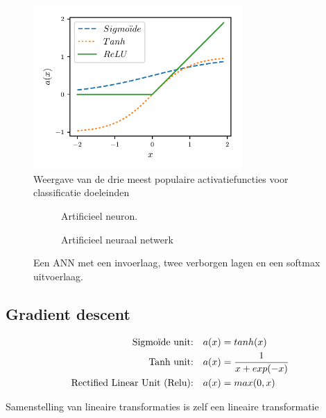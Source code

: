 \begin{figure}[ht]
	\begin{center}
		\includegraphics[width=8cm,keepaspectratio]{figuren/activatiefuncties.pdf}
		\caption{Weergave van de drie meest populaire activatiefuncties voor classificatie doeleinden \label{class-functies}}
	\end{center}
\end{figure}

\begin{figure}
	\centering
	\begin{subfigure}{.5\textwidth}
		\centering
		
		\caption{Artificieel neuron.}
		\label{neuron}
	\end{subfigure}%
	\begin{subfigure}{.5\textwidth}
		\centering
		
		\caption{Artificieel neuraal netwerk}
		\label{fig:sub2}
	\end{subfigure}
	\caption{Een ANN met een invoerlaag, twee verborgen lagen en een softmax uitvoerlaag.}
	\label{fig:test}
\end{figure}

\subsection{Gradient descent}



\begin{equation}
\begin{aligned}
\textup{Sigmo\"ide unit:}\quad& a(x) = tanh(x)\\
\textup{Tanh unit:}\quad& a(x) = \frac{1}{x+exp(-x)}\\
\textup{Rectified Linear Unit (Relu):}\quad& a(x) = max(0,x)
\end{aligned}
\end{equation}

\npar Samenstelling van lineaire transformaties is zelf een lineaire transformatie
